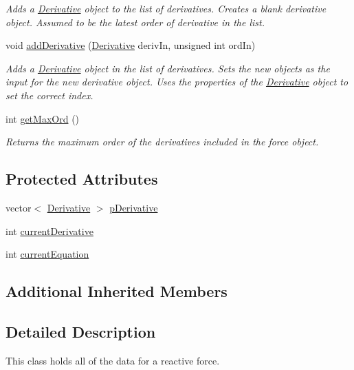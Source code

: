 \begin{DoxyCompactItemize}
\begin{DoxyCompactList}\small\item\em Adds a \hyperlink{class_derivative}{Derivative} object to the list of derivatives. Creates a blank derivative object. Assumed to be the latest order of derivative in the list. \end{DoxyCompactList}\item 
void \hyperlink{class_force_react_a7f860f5726f2f9f9baba9775dc72f1ff}{add\-Derivative} (\hyperlink{class_derivative}{Derivative} deriv\-In, unsigned int ord\-In)
\begin{DoxyCompactList}\small\item\em Adds a \hyperlink{class_derivative}{Derivative} object in the list of derivatives. Sets the new objects as the input for the new derivative object. Uses the properties of the \hyperlink{class_derivative}{Derivative} object to set the correct index. \end{DoxyCompactList}\item 
int \hyperlink{class_force_react_ae11cdc98d818ca97f710ed13e584c53f}{get\-Max\-Ord} ()
\begin{DoxyCompactList}\small\item\em Returns the maximum order of the derivatives included in the force object. \end{DoxyCompactList}\end{DoxyCompactItemize}
\subsection*{Protected Attributes}
\begin{DoxyCompactItemize}
\item 
vector$<$ \hyperlink{class_derivative}{Derivative} $>$ \hyperlink{class_force_react_acc35d8bc370b9b2dff713c91876185dd}{p\-Derivative}
\item 
int \hyperlink{class_force_react_a8dc7b57cd803c0cba35613ff0f8be1ef}{current\-Derivative}
\item 
int \hyperlink{class_force_react_a124b3309513a17df0c1d704f9550005f}{current\-Equation}
\end{DoxyCompactItemize}
\subsection*{Additional Inherited Members}


\subsection{Detailed Description}
This class holds all of the data for a reactive force. 

